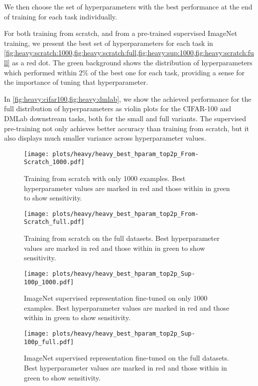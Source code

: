 \documentclass{article}
\newcommand{\imagenet}{ImageNet}
\begin{document}
We then choose the set of hyperparameters with the best performance at the end of training for each task individually.

For both training from scratch, and from a pre-trained supervised \imagenet{} training, we present the best set of hyperparameters for each task in \cref{fig:heavy:scratch:1000,fig:heavy:scratch:full,fig:heavy:sup:1000,fig:heavy:scratch:full} as a red dot.
The green background shows the distribution of hyperparameters which performed within 2\% of the best one for each task, providing a sense for the importance of tuning that hyperparameter.

In \cref{fig:heavy:cifar100,fig:heavy:dmlab}, we show the achieved performance for the full distribution of hyperparameters as violin plots for the CIFAR-100 and DMLab downstream tasks, both for the small and full variants.
The supervised pre-training not only achieves better accuracy than training from scratch, but it also displays much smaller variance across hyperparameter values.
\clearpage

\begin{figure}[!h]
\centering
\texttt{[image: plots/heavy/heavy\_best\_hparam\_top2p\_From-Scratch\_1000.pdf]}
\caption{Training from scratch with only 1000 examples. Best hyperparameter values are marked in red and those within  in green to show sensitivity.}\label{fig:heavy:scratch:1000}
\end{figure}

\begin{figure}[!h]
\centering
\texttt{[image: plots/heavy/heavy\_best\_hparam\_top2p\_From-Scratch\_full.pdf]}
\caption{Training from scratch on the full datasets. Best hyperparameter values are marked in red and those within  in green to show sensitivity.}\label{fig:heavy:scratch:full}
\end{figure}

\begin{figure}[!h]
\centering
\texttt{[image: plots/heavy/heavy\_best\_hparam\_top2p\_Sup-100p\_1000.pdf]}
\caption{\imagenet{} supervised representation fine-tuned on only 1000 examples. Best hyperparameter values are marked in red and those within  in green to show sensitivity.}\label{fig:heavy:sup:1000}
\end{figure}

\begin{figure}[!h]
\centering
\texttt{[image: plots/heavy/heavy\_best\_hparam\_top2p\_Sup-100p\_full.pdf]}
\caption{\imagenet{} supervised representation fine-tuned on the full datasets. Best hyperparameter values are marked in red and those within  in green to show sensitivity.}\label{fig:heavy:sup:full}
\end{figure}
\end{document}
